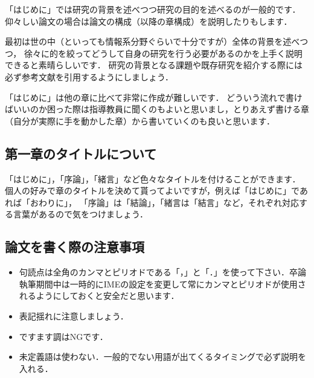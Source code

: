 「はじめに」では研究の背景を述べつつ研究の目的を述べるのが一般的です．
仰々しい論文の場合は論文の構成（以降の章構成）を説明したりもします．

最初は世の中（といっても情報系分野ぐらいで十分ですが）全体の背景を述べつつ，
徐々に的を絞ってどうして自身の研究を行う必要があるのかを上手く説明できると素晴らしいです．
研究の背景となる課題や既存研究を紹介する際には必ず参考文献を引用するようにしましょう．

「はじめに」は他の章に比べて非常に作成が難しいです．
どういう流れで書けばいいのか困った際は指導教員に聞くのもよいと思いまし，とりあえず書ける章（自分が実際に手を動かした章）から書いていくのも良いと思います．

\subsection{第一章のタイトルについて}
「はじめに」，「序論」，「緒言」など色々なタイトルを付けることができます．
個人の好みで章のタイトルを決めて貰ってよいですが，例えば「はじめに」であれば「おわりに」，
「序論」は「結論」，「緒言は「結言」など，それぞれ対応する言葉があるので気をつけましょう．

\subsection{論文を書く際の注意事項}
\begin{itemize}
    \item 句読点は全角のカンマとピリオドである「，」と「．」を使って下さい．卒論執筆期間中は一時的にIMEの設定を変更して常にカンマとピリオドが使用されるようにしておくと安全だと思います．
    \item 表記揺れに注意しましょう．
    \item ですます調はNGです．
    \item 未定義語は使わない．一般的でない用語が出てくるタイミングで必ず説明を入れる．
\end{itemize}